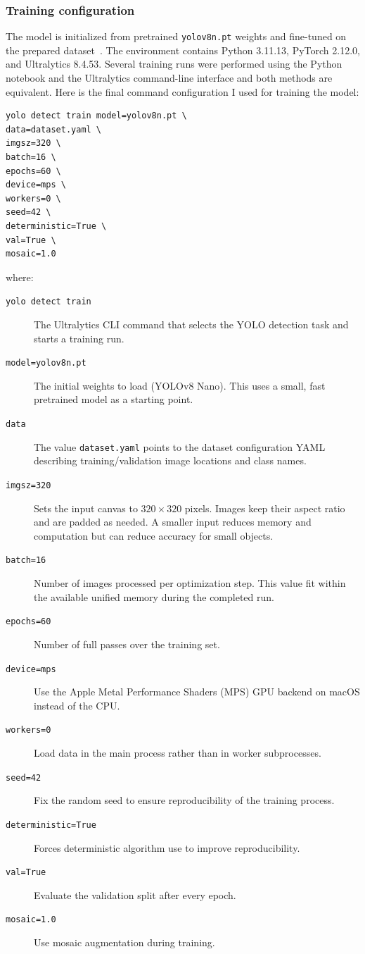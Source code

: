 \documentclass[a4paper,12pt]{report}
\begin{document}
\subsubsection{Training configuration}
The model is initialized from pretrained \texttt{yolov8n.pt} weights and fine-tuned on the prepared
dataset~\parencite{ultralytics}. The environment contains Python 3.11.13, PyTorch 2.12.0, and
Ultralytics 8.4.53.
Several training runs were performed using the Python notebook and the Ultralytics command-line
interface and both methods are equivalent. Here is the final command configuration I used for
training the model:
\begin{verbatim}
yolo detect train model=yolov8n.pt \
data=dataset.yaml \
imgsz=320 \
batch=16 \
epochs=60 \
device=mps \
workers=0 \
seed=42 \
deterministic=True \
val=True \
mosaic=1.0
\end{verbatim}
where:
\begin{description}
  \item[\texttt{yolo detect train}] The Ultralytics CLI command that selects the YOLO detection task
and starts a training run.
  \item[\texttt{model=yolov8n.pt}] The initial weights to load (YOLOv8 Nano). This uses a small,
fast pretrained model as a starting point.
  \item[\texttt{data}] The value \texttt{dataset.yaml} points to the dataset configuration YAML
describing training/validation image locations and class names.
  \item[\texttt{imgsz=320}] Sets the input canvas to $320 \times 320$ pixels. Images keep their
aspect ratio and are padded as needed. A smaller input reduces memory and computation but can
reduce accuracy for small objects.
  \item[\texttt{batch=16}] Number of images processed per optimization step. This value fit within
the available unified memory during the completed run.
  \item[\texttt{epochs=60}] Number of full passes over the training set.
  \item[\texttt{device=mps}] Use the Apple Metal Performance Shaders (MPS) GPU backend on macOS
instead of the CPU.
  \item[\texttt{workers=0}] Load data in the main process rather than in worker subprocesses.
  \item[\texttt{seed=42}] Fix the random seed to ensure reproducibility of the training process.
  \item[\texttt{deterministic=True}] Forces deterministic algorithm use to improve reproducibility.
  \item[\texttt{val=True}] Evaluate the validation split after every epoch.
  \item[\texttt{mosaic=1.0}] Use mosaic augmentation during training.
\end{description}
\end{document}
